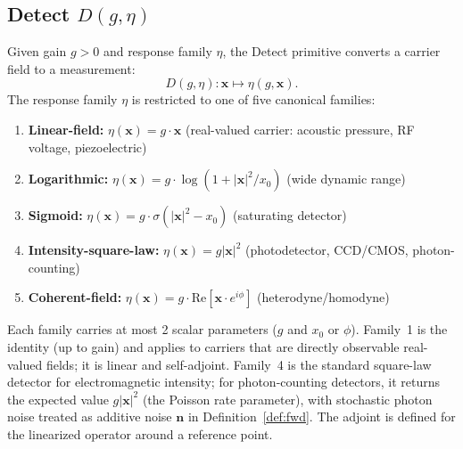 \documentclass[11pt]{article}
\begin{document}
\subsection{Detect \texorpdfstring{$D(g, \eta)$}{D(g, eta)}}

\begin{definition}[Detect]
\label{def:detect}
Given gain $g > 0$ and response family $\eta$, the Detect primitive converts a carrier field to a measurement:
\begin{equation}
  D(g, \eta): \mathbf{x} \mapsto \eta(g, \mathbf{x}).
\end{equation}
The response family $\eta$ is restricted to one of five canonical families:
\begin{enumerate}
  \item \textbf{Linear-field:} $\eta(\mathbf{x}) = g \cdot \mathbf{x}$ \quad (real-valued carrier: acoustic pressure, RF voltage, piezoelectric)
  \item \textbf{Logarithmic:} $\eta(\mathbf{x}) = g \cdot \log(1 + |\mathbf{x}|^2/x_0)$ \quad (wide dynamic range)
  \item \textbf{Sigmoid:} $\eta(\mathbf{x}) = g \cdot \sigma(|\mathbf{x}|^2 - x_0)$ \quad (saturating detector)
  \item \textbf{Intensity-square-law:} $\eta(\mathbf{x}) = g|\mathbf{x}|^2$ \quad (photodetector, CCD/CMOS, photon-counting)
  \item \textbf{Coherent-field:} $\eta(\mathbf{x}) = g \cdot \mathrm{Re}[\mathbf{x} \cdot e^{i\phi}]$ \quad (heterodyne/homodyne)
\end{enumerate}
Each family carries at most 2 scalar parameters ($g$ and $x_0$ or $\phi$). Family~1 is the identity (up to gain) and applies to carriers that are directly observable real-valued fields; it is linear and self-adjoint. Family~4 is the standard square-law detector for electromagnetic intensity; for photon-counting detectors, it returns the expected value $g|\mathbf{x}|^2$ (the Poisson rate parameter), with stochastic photon noise treated as additive noise $\mathbf{n}$ in Definition~\ref{def:fwd}. The adjoint is defined for the linearized operator around a reference point.
\end{definition}
\end{document}
